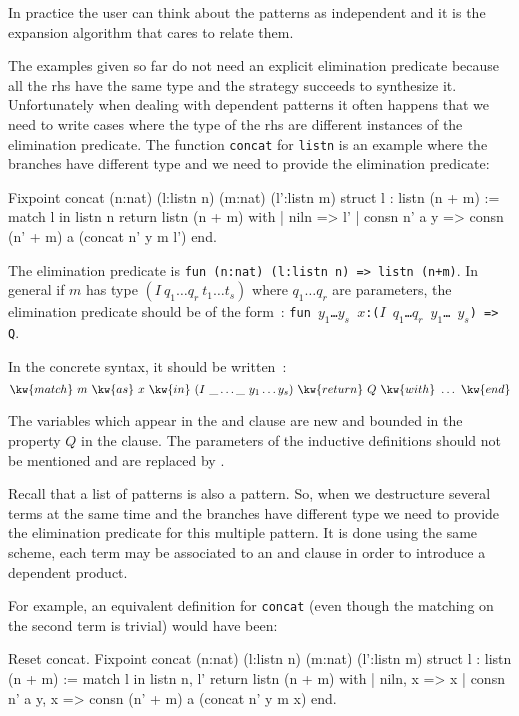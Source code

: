 In practice the user can think about the patterns as independent and
it is the expansion algorithm that cares to relate them. \\
\fi
%
%
%

The examples  given so far do not need an explicit elimination predicate
 because all the rhs have the same type and the
strategy succeeds to synthesize it.
Unfortunately when dealing with dependent patterns it often happens
that we need to write cases where the type of the rhs are 
different  instances of the elimination  predicate.
The function  \texttt{concat} for \texttt{listn}
is an example where the branches have different type
and we need to provide the elimination predicate:

\begin{coq_example}
Fixpoint concat (n:nat) (l:listn n) (m:nat) (l':listn m) {struct l} :
 listn (n + m) :=
  match l in listn n return listn (n + m) with
  | niln => l'
  | consn n' a y => consn (n' + m) a (concat n' y m l')
  end.
\end{coq_example}
The elimination predicate is {\tt fun (n:nat) (l:listn n) => listn~(n+m)}.
In general if $m$ has type $(I~q_1\ldots q_r~t_1\ldots t_s)$ where 
$q_1\ldots q_r$ are parameters, the elimination predicate should be of
the form~:
{\tt fun $y_1$\ldots $y_s$ $x$:($I$~$q_1$\ldots $q_r$~$y_1$\ldots
  $y_s$) => Q}.

In the concrete syntax, it should be written~:
\[ \kw{match}~m~\kw{as}~x~\kw{in}~(I~\_\ldots \_~y_1\ldots y_s)~\kw{return}~Q~\kw{with}~\ldots~\kw{end}\]

The variables which appear in the  and  clause are new
and bounded in the property $Q$ in the  clause. The
parameters of the inductive definitions should not be mentioned and
are replaced by \kw{\_}.

Recall that a list of patterns is also a pattern. So, when
we destructure several terms at the same time and the branches have
different type  we need to provide
the elimination predicate for this multiple pattern. 
It is done using the same scheme, each term may be associated to an
 and  clause in order to introduce a dependent product.

For example, an equivalent definition for \texttt{concat} (even though the matching on the second term is trivial) would have
been:

\begin{coq_example}
Reset concat.
Fixpoint concat (n:nat) (l:listn n) (m:nat) (l':listn m) {struct l} :
 listn (n + m) :=
  match l in listn n, l' return listn (n + m) with
  | niln, x => x
  | consn n' a y, x => consn (n' + m) a (concat n' y m x)
  end.
\end{coq_example}

